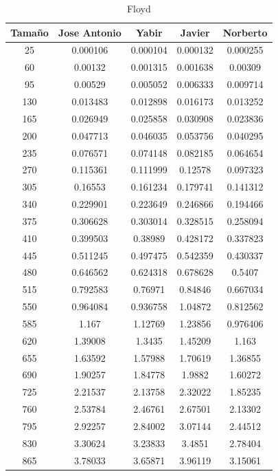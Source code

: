 \documentclass[11pt,a4paper]{article}
\begin{document}
\begin{table}[h]
	\centering
	\caption{Floyd}
	\begin{tabular}{ | c | c  | c | c | c | }
		\hline
		Tama\~no & Jose Antonio & Yabir & Javier & Norberto\\ 
		\hline
		25	&	0.000106	&	0.000104	&	0.000132	&	0.000255	\\
		60	&	0.00132	&	0.001315	&	0.001638	&	0.00309	\\
		95	&	0.00529	&	0.005052	&	0.006333	&	0.009714	\\
		130	&	0.013483	&	0.012898	&	0.016173	&	0.013252	\\
		165	&	0.026949	&	0.025858	&	0.030908	&	0.023836	\\
		200	&	0.047713	&	0.046035	&	0.053756	&	0.040295	\\
		235	&	0.076571	&	0.074148	&	0.082185	&	0.064654	\\
		270	&	0.115361	&	0.111999	&	0.12578	&	0.097323	\\
		305	&	0.16553	&	0.161234	&	0.179741	&	0.141312	\\
		340	&	0.229901	&	0.223649	&	0.246866	&	0.194466	\\
		375	&	0.306628	&	0.303014	&	0.328515	&	0.258094	\\
		410	&	0.399503	&	0.38989	&	0.428172	&	0.337823	\\
		445	&	0.511245	&	0.497475	&	0.542359	&	0.430337	\\
		480	&	0.646562	&	0.624318	&	0.678628	&	0.5407	\\
		515	&	0.792583	&	0.76971	&	0.84846	&	0.667034	\\
		550	&	0.964084	&	0.936758	&	1.04872	&	0.812562	\\
		585	&	1.167	&	1.12769	&	1.23856	&	0.976406	\\
		620	&	1.39008	&	1.3435	&	1.45209	&	1.163	\\
		655	&	1.63592	&	1.57988	&	1.70619	&	1.36855	\\
		690	&	1.90257	&	1.84778	&	1.9882	&	1.60272	\\
		725	&	2.21537	&	2.13758	&	2.32022	&	1.85235	\\
		760	&	2.53784	&	2.46761	&	2.67501	&	2.13302	\\
		795	&	2.92257	&	2.84002	&	3.07144	&	2.44512	\\
		830	&	3.30624	&	3.23833	&	3.4851	&	2.78404	\\
		865	&	3.78033	&	3.65871	&	3.96119	&	3.15061	\\
		\hline
	\end{tabular}
\end{table}
\end{document}
